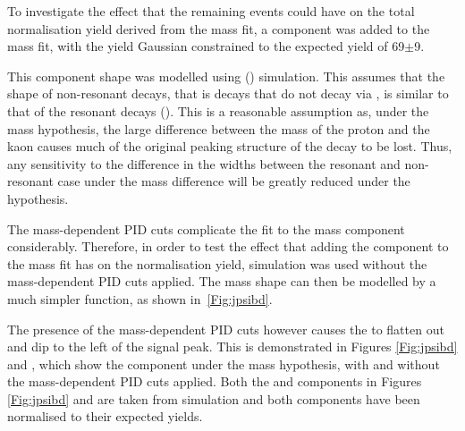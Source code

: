 To investigate the effect that the remaining \Bd\to\jpsi\Kp\pim events could have on the total normalisation yield derived from the \Lbpijpsi mass fit, a \Bd\to\jpsi\Kp\pim component was added to the \Lbpijpsi mass fit, with the \Bd\to\jpsi\Kp\pim yield Gaussian constrained to the expected yield of 69$\pm$9.

This \Bd\to\jpsi\Kp\pim component shape was modelled using \Bd\to\jpsi\Kstarz(\to\Kp\pim) simulation. This assumes that the shape of non-resonant decays, that is \Bd\to\jpsi\Kp\pim decays that do not decay via \Kstarz, is similar to that of the resonant decays \Bd\to\jpsi\Kstarz(\to\Kp\pim). This is a reasonable assumption as, under the \jpsi\proton\pim mass hypothesis, the large difference between the mass of the proton and the kaon causes much of the original peaking structure of the decay to be lost. Thus, any sensitivity to the difference in the widths between the resonant and non-resonant case under the \jpsi\Kp\pim mass difference will be greatly reduced under the \jpsi\proton\pim hypothesis.

The mass-dependent PID cuts complicate the fit to the \BdToJPsiKst mass component considerably. Therefore, in order to test the effect that adding the \BdToJPsiKst component to the \Lbpijpsi mass fit has on the normalisation yield, simulation was used without the mass-dependent PID cuts applied. The mass shape can then be modelled by a much simpler function, as shown in~\autoref{Fig:jpsibd}\protect{}.


The presence of the mass-dependent PID cuts however causes the \BdToJPsiKst to flatten out and dip to the left of the \Lbpijpsi signal peak. This is demonstrated in Figures \ref{Fig:jpsibd}\protect{} and \protect{}, which show the \BdToJPsiKst component under the \Lbpijpsi mass hypothesis, with and without the mass-dependent PID cuts applied. Both the \Lbpijpsi and \BdToJPsiKst components in Figures \ref{Fig:jpsibd}\protect{} and \protect{} are taken from simulation and both components have been normalised to their expected yields.


